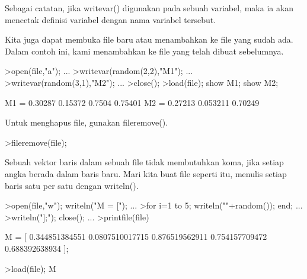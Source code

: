 \documentclass[12pt,arial,letterpaper]{book}
\begin{document}
\begin{eulernootebook}
\begin{eulercomment}
\begin{eulercomment}
\begin{eulernootebook}
\begin{eulercomment}
\begin{eulercomment}
\begin{eulercomment}
\begin{eulercomment}
\begin{eulercomment}
\begin{eulercomment}
\begin{eulercomment}
\begin{eulercomment}
\begin{eulercomment}
\begin{eulercomment}
\begin{eulercomment}
\begin{eulercomment}
\begin{eulercomment}
\begin{eulercomment}
Sebagai catatan, jika writevar() digunakan pada sebuah variabel, maka
ia akan mencetak definisi variabel dengan nama variabel tersebut.
\end{eulercomment}
\begin{eulercomment}
Kita juga dapat membuka file baru atau menambahkan ke file yang sudah
ada. Dalam contoh ini, kami menambahkan ke file yang telah dibuat
sebelumnya.
\end{eulercomment}
\begin{eulerprompt}
>open(file,"a"); ...
>writevar(random(2,2),"M1"); ...
>writevar(random(3,1),"M2"); ...
>close();
>load(file); show M1; show M2;
\end{eulerprompt}
\begin{euleroutput}
  M1 = 
    0.30287   0.15372 
     0.7504   0.75401 
  M2 = 
    0.27213 
   0.053211 
    0.70249 
\end{euleroutput}
\begin{eulercomment}
Untuk menghapus file, gunakan fileremove().
\end{eulercomment}
\begin{eulerprompt}
>fileremove(file);
\end{eulerprompt}
\begin{eulercomment}
Sebuah vektor baris dalam sebuah file tidak membutuhkan koma, jika
setiap angka berada dalam baris baru. Mari kita buat file seperti itu,
menulis setiap baris satu per satu dengan writeln().
\end{eulercomment}
\begin{eulerprompt}
>open(file,"w"); writeln("M = ["); ...
>for i=1 to 5; writeln(""+random()); end; ...
>writeln("];"); close(); ...
>printfile(file)
\end{eulerprompt}
\begin{euleroutput}
  M = [
  0.344851384551
  0.0807510017715
  0.876519562911
  0.754157709472
  0.688392638934
  ];
\end{euleroutput}
\begin{eulerprompt}
>load(file); M
\end{eulerprompt}
\begin{euleroutput}

\end{euleroutput}
\end{eulercomment}
\end{eulercomment}
\end{eulercomment}
\end{eulercomment}
\end{eulercomment}
\end{eulercomment}
\end{eulercomment}
\end{eulercomment}
\end{eulercomment}
\end{eulercomment}
\end{eulercomment}
\end{eulercomment}
\end{eulercomment}
\end{eulernootebook}
\end{eulercomment}
\end{eulercomment}
\end{eulernootebook}
\end{document}
